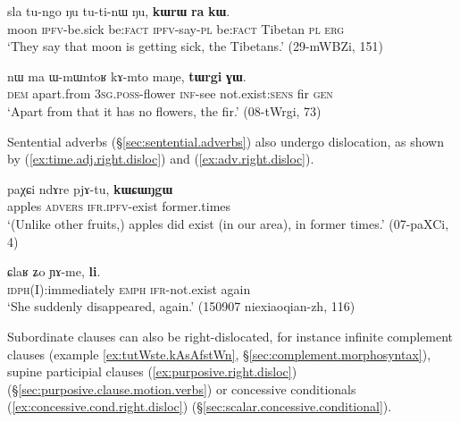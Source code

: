 \begin{exe}
\ex \label{ex:A.right.disloc}
\gll sla tu-ngo ŋu tu-ti-nɯ ŋu, \textbf{kɯrɯ} \textbf{ra} \textbf{kɯ}. \\
moon \textsc{ipfv}-be.sick be:\textsc{fact} \textsc{ipfv}-say-\textsc{pl} be:\textsc{fact} Tibetan \textsc{pl} \textsc{erg} \\
\glt `They say that moon is getting sick, the Tibetans.' (29-mWBZi, 151)
\end{exe}


\begin{exe}
\ex \label{ex:possessor.right.disloc}
\gll nɯ ma ɯ-mɯntoʁ kɤ-mto maŋe, \textbf{tɯrgi} \textbf{ɣɯ}. \\
\textsc{dem} apart.from \textsc{3sg}.\textsc{poss}-flower \textsc{inf}-see not.exist:\textsc{sens} fir \textsc{gen} \\
\glt `Apart from that it has no flowers, the fir.' (08-tWrgi, 73)
\end{exe}

Sentential adverbs (§\ref{sec:sentential.adverbs}) also undergo dislocation, as shown by (\ref{ex:time.adj.right.disloc}) and (\ref{ex:adv.right.disloc}).

\begin{exe}
\ex \label{ex:time.adj.right.disloc}
\gll paχɕi ndɤre pjɤ-tu, \textbf{kɯɕɯŋgɯ} \\
apples \textsc{advers} \textsc{ifr}.\textsc{ipfv}-exist former.times \\
\glt `(Unlike other fruits,) apples did exist (in our area), in former times.' (07-paXCi, 4)
\end{exe}

\begin{exe}
\ex \label{ex:adv.right.disloc}
\gll ɕlaʁ ʑo ɲɤ-me, \textbf{li}. \\
\textsc{idph}(I):immediately \textsc{emph} \textsc{ifr}-not.exist again \\
\glt `She suddenly disappeared, again.' (150907 niexiaoqian-zh, 116)
\end{exe}


Subordinate clauses can also be right-dislocated, for instance infinite complement clauses (example \ref{ex:tutWste.kAsAfstWn}, §\ref{sec:complement.morphosyntax}), supine participial clauses (\ref{ex:purposive.right.disloc}) (§\ref{sec:purposive.clause.motion.verbs}) or concessive conditionals (\ref{ex:concessive.cond.right.disloc}) (§\ref{sec:scalar.concessive.conditional}).



